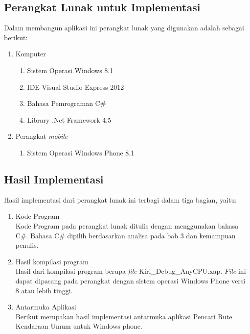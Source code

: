 \subsection{Perangkat Lunak untuk Implementasi}
\label{lab:Perangkat Lunak untuk Implementasi}
\hspace{0.5cm} Dalam membangun aplikasi ini perangkat lunak yang digunakan adalah sebagai berikut:
\begin{enumerate}
	\item Komputer
		\begin{enumerate}
			\item Sistem Operasi Windows 8.1
			\item IDE Visual Studio Express 2012
			\item Bahasa Pemrograman C\#
			\item Library .Net Framework 4.5
		\end{enumerate}
		
	\item Perangkat \textit{mobile}
		\begin{enumerate}
			\item Sistem Operasi Windows Phone 8.1
		\end{enumerate}
\end{enumerate}

\subsection{Hasil Implementasi}
\label{lab:Hasil Implementasi}
\hspace{0.5cm} Hasil implementasi dari perangkat lunak ini terbagi dalam tiga bagian, yaitu:
\begin{enumerate}
	\item Kode Program \\
	Kode Program pada perangkat lunak ditulis dengan menggunakan bahasa C\#. Bahasa C\# dipilih berdasarkan analisa pada bab 3 dan kemampuan penulis.
	\item Hasil kompilasi program \\
	Hasil dari kompilasi program berupa \textit{file} Kiri\_Debug\_AnyCPU.xap. \textit{File} ini dapat dipasang pada perangkat dengan sistem operasi Windows Phone versi 8 atau lebih tinggi.
	\item Antarmuka Aplikasi \\
	Berikut merupakan hasil implementasi antarmuka aplikasi Pencari Rute Kendaraan Umum untuk Windows phone.
\end{enumerate}

